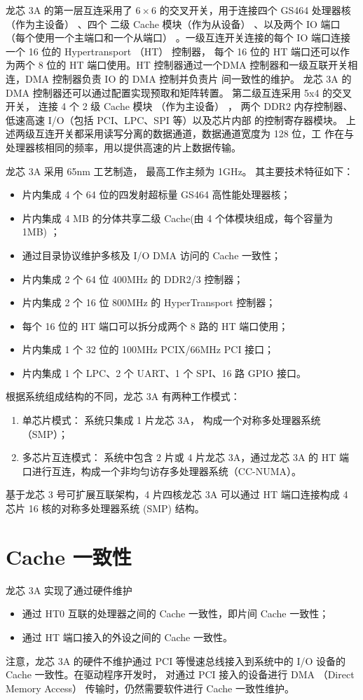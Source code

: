 龙芯 3A 的第一层互连采用了 $6\times6$ 的交叉开关，用于连接四个 GS464 处理器核
（作为主设备） 、四个 二级 Cache 模块（作为从设备） 、以及两个 IO
端口（每个使用一个主端口和一个从端口） 。一级互连开关连接的每个 IO 端口连接一个
16 位的 Hypertransport （HT） 控制器， 每个 16 位的 HT 端口还可以作为两个 8
位的 HT 端口使用。HT 控制器通过一个DMA 控制器和一级互联开关相连，DMA 控制器负责
IO 的 DMA 控制并负责片 间一致性的维护。 龙芯 3A 的 DMA
控制器还可以通过配置实现预取和矩阵转置。 第二级互连采用 5x4 的交叉开关， 连接 4
个 2 级 Cache 模块 （作为主设备） ， 两个 DDR2 内存控制器、低速高速 I/O（包括
PCI、LPC、SPI 等）以及芯片内部 的控制寄存器模块。
上述两级互连开关都采用读写分离的数据通道，数据通道宽度为 128 位，工
作在与处理器核相同的频率，用以提供高速的片上数据传输。 

龙芯 3A 采用 65nm 工艺制造， 最高工作主频为 1GHz。 其主要技术特征如下：
\begin{itemize}
	\item 片内集成 4 个 64 位的四发射超标量 GS464 高性能处理器核；
	\item 片内集成 4 MB 的分体共享二级 Cache(由 4 个体模块组成，每个容量为 1MB) ；
	\item 通过目录协议维护多核及 I/O DMA 访问的 Cache 一致性；
	\item 片内集成 2 个 64 位 400MHz 的 DDR2/3 控制器；
	\item 片内集成 2 个 16 位 800MHz 的 HyperTransport 控制器；
	\item 每个 16 位的 HT 端口可以拆分成两个 8 路的 HT 端口使用；
	\item 片内集成 1 个 32 位的 100MHz PCIX/66MHz PCI 接口；
	\item 片内集成 1 个 LPC、2 个 UART、1 个 SPI、16 路 GPIO 接口。
\end{itemize}

\noindent 根据系统组成结构的不同，龙芯 3A 有两种工作模式：
\begin{enumerate}
  \item 单芯片模式： 系统只集成 1 片龙芯 3A， 构成一个对称多处理器系统 （SMP）；
  \item 多芯片互连模式： 系统中包含 2 片或 4 片龙芯 3A，通过龙芯 3A 的 HT
    端口进行互连，构成一个非均匀访存多处理器系统（CC-NUMA）。
\end{enumerate}
基于龙芯 3
号可扩展互联架构，4 片四核龙芯 3A 可以通过 HT 端口连接构成 4 芯片 16
核的对称多处理器系统 (SMP) 结构。

\section{Cache 一致性}

龙芯 3A 实现了通过硬件维护
\begin{itemize}
  \item 通过 HT0 互联的处理器之间的 Cache 一致性，即片间 Cache 一致性；
  \item 通过 HT 端口接入的外设之间的 Cache 一致性。
\end{itemize}
注意，龙芯 3A 的硬件不维护通过 PCI 等慢速总线接入到系统中的 I/O 设备的 Cache
一致性。在驱动程序开发时， 对通过 PCI 接入的设备进行 DMA （Direct Memory
Access） 传输时，仍然需要软件进行 Cache 一致性维护。

